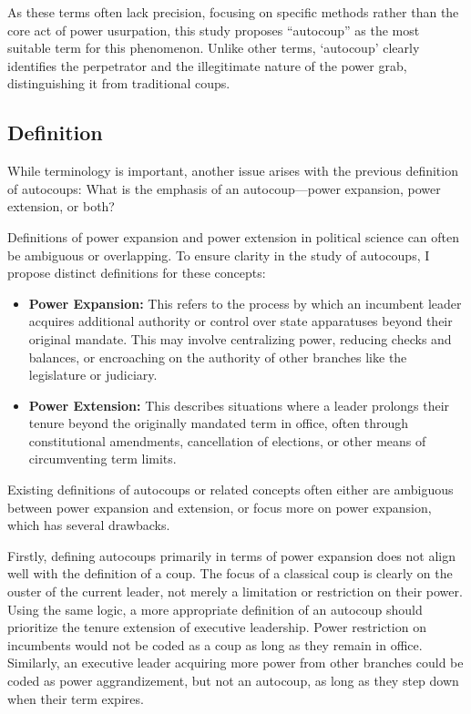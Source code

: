 \documentclass[
  12pt,
]{report}
\begin{document}
As these terms often lack precision, focusing on specific methods rather
than the core act of power usurpation, this study proposes ``autocoup''
as the most suitable term for this phenomenon. Unlike other terms,
`autocoup' clearly identifies the perpetrator and the illegitimate
nature of the power grab, distinguishing it from traditional coups.

\subsection{Definition}\label{definition}

While terminology is important, another issue arises with the previous
definition of autocoups: What is the emphasis of an autocoup---power
expansion, power extension, or both?

Definitions of power expansion and power extension in political science
can often be ambiguous or overlapping. To ensure clarity in the study of
autocoups, I propose distinct definitions for these concepts:

\begin{itemize}
\item
  \textbf{Power Expansion:} This refers to the process by which an
  incumbent leader acquires additional authority or control over state
  apparatuses beyond their original mandate. This may involve
  centralizing power, reducing checks and balances, or encroaching on
  the authority of other branches like the legislature or judiciary.
\item
  \textbf{Power Extension:} This describes situations where a leader
  prolongs their tenure beyond the originally mandated term in office,
  often through constitutional amendments, cancellation of elections, or
  other means of circumventing term limits.
\end{itemize}

Existing definitions of autocoups or related concepts often either are
ambiguous between power expansion and extension, or focus more on power
expansion, which has several drawbacks.

Firstly, defining autocoups primarily in terms of power expansion does
not align well with the definition of a coup. The focus of a classical
coup is clearly on the ouster of the current leader, not merely a
limitation or restriction on their power. Using the same logic, a more
appropriate definition of an autocoup should prioritize the tenure
extension of executive leadership. Power restriction on incumbents would
not be coded as a coup as long as they remain in office. Similarly, an
executive leader acquiring more power from other branches could be coded
as power aggrandizement, but not an autocoup, as long as they step down
when their term expires.
\end{document}
